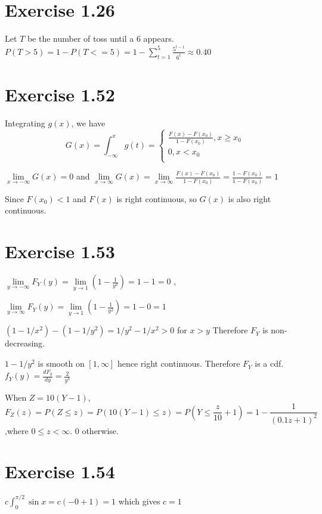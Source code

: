 \documentclass[12pt]{article}
\begin{document}
\section*{Exercise 1.26}
Let $T$ be the number of toss until a $6$ appears.
$P(T > 5) = 1- P(T <= 5) = 1 - \sum_{t=1}^5 \frac{5^{t-1}}{6^t} \approx 0.40$

\section*{Exercise 1.52}
Integrating $g(x)$, we have
\begin{equation*}
 G(x) = \int_{-\infty}^x g(t) = \begin{cases}
       \frac{F(x) - F(x_0)}{1-F(x_0)}, x \geq x_0 \\
       0, x < x_0 \\
     \end{cases}
\end{equation*}

$\lim\limits_{x \rightarrow -\infty} G(x) = 0$ and $\lim\limits_{x \rightarrow \infty} G(x) = \lim\limits_{x \rightarrow \infty} \frac{F(x) - F(x_0)}{1-F(x_0)} = \frac{1 - F(x_0)}{1-F(x_0)} = 1 $

Since $F(x_0)<1$ and $F(x)$ is right continuous, so $G(x)$ is also right continuous.


\section*{Exercise 1.53}
$\lim\limits_{y\rightarrow -\infty}F_Y(y) = \lim\limits_{y\rightarrow 1} (1- \frac{1}{y^2}) = 1 -1 = 0$ , 

$\lim\limits_{y\rightarrow \infty}F_Y(y) = \lim\limits_{y\rightarrow 1} (1- \frac{1}{y^2}) = 1 - 0 = 1$ 

$ (1 - 1/x^2) - (1 - 1/y^2) = 1/y^2 - 1/x^2 > 0 $ for $ x > y$ Therefore $F_Y$ is non-decreasing.

$1 - 1/y^2$ is smooth on $[1,\infty]$ hence right continuous. Therefore $F_Y$ is a cdf.\\

$f_Y(y) = \frac{d F_y}{dy} = \frac{2}{y^3}$

When $Z=10(Y-1)$, $$F_Z(z) = P(Z\leq z) = P(10(Y-1) \leq z) = P(Y \leq \frac{z}{10} + 1) = 1 - \frac{1}{(0.1z + 1)^2}$$ ,where $0 \leq z < \infty$. 0 otherwise. 

\section*{Exercise 1.54}
$c \int_0^{\pi/2}\sin{x} = c(- 0 + 1) = 1$ which gives $c = 1$
\end{document}

